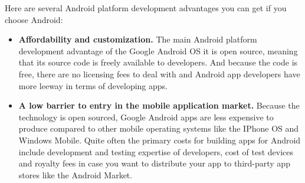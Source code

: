 Here are several Android platform development advantages you can get if you
choose Android:

\begin{itemize}
\item \textbf{Affordability and customization.} The main Android platform
development advantage of the Google Android OS it is open source, meaning that
its source code is freely available to developers. And because the code is free,
there are no licensing fees to deal with and Android app developers have more
leeway in terms of developing apps.

\item \textbf{A low barrier to entry in the mobile application market.} Because
the technology is open sourced, Google Android apps are less expensive to produce
compared to other mobile operating systems like the IPhone OS and Windows Mobile.
Quite often the primary costs for building apps for Android include development
and testing expertise of developers, cost of test devices and royalty fees in
case you want to distribute your app to third-party app stores like the Android
Market.
\end{itemize}










